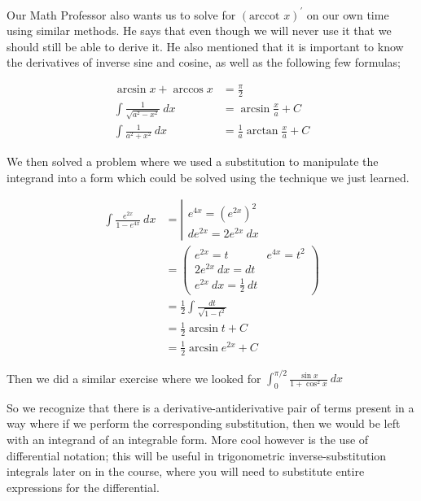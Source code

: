 \documentclass{article}
\begin{document}
Our Math Professor also wants us to solve for $(\mbox{arccot }x)^\prime$ on our own time using similar methods. He says that even though we will never use it that we should still be able to derive it. He also mentioned that it is important to know the derivatives of inverse sine and cosine, as well as the following few formulas;

\begin{align}
\arcsin x+\arccos x&=\frac{\pi}{2}\\
\int\frac{1}{\sqrt{a^2-x^2}}\ dx&=\arcsin\frac{x}{a}+C\\
\int\frac{1}{a^2+x^2}\ dx&=\frac{1}{a}\arctan\frac{x}{a}+C
\end{align}

\vspace{10pt}

We then solved a problem where we used a substitution to manipulate the integrand into a form which could be solved using the technique we just learned.

\begin{align*}
\int\frac{e^{2x}}{1-e^{4x}}\ dx&=\left|\begin{array}{c}e^{4x}=(e^{2x})^2\\de^{2x}=2e^{2x}\ dx\end{array}\right.\\
&=\left(\begin{array}{cl}e^{2x}=t &e^{4x}=t^2\\2e^{2x}\ dx=dt&\\
e^{2x}\ dx=\frac{1}{2}\ dt&\end{array}\right)\\
&=\frac{1}{2}\int\frac{dt}{\sqrt{1-t^2}}\\
&=\frac{1}{2}\arcsin t+C\\
&=\frac{1}{2}\arcsin e^{2x}+C
\end{align*}

\vspace{10pt}

Then we did a similar exercise where we looked for $\displaystyle\int_0^{\pi/2}\frac{\sin x}{1+\cos^2x}\ dx$

\vspace{10pt}

So we recognize that there is a derivative-antiderivative pair of terms present in a way where if we perform the corresponding substitution, then we would be left with an integrand of an integrable form. More cool however is the use of differential notation; this will be useful in trigonometric inverse-substitution integrals later on in the course, where you will need to substitute entire expressions for the differential.
\end{document}
